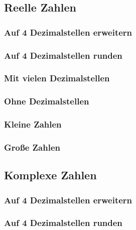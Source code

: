 \subsection{Reelle Zahlen}

\subsubsection{Auf 4 Dezimalstellen erweitern}

\subsubsection{Auf 4 Dezimalstellen runden}

\subsubsection{Mit vielen Dezimalstellen}

\subsubsection{Ohne Dezimalstellen}

\subsubsection{Kleine Zahlen}

\subsubsection{Große Zahlen}

\subsection{Komplexe Zahlen}

\subsubsection{Auf 4 Dezimalstellen erweitern}

\subsubsection{Auf 4 Dezimalstellen runden}

